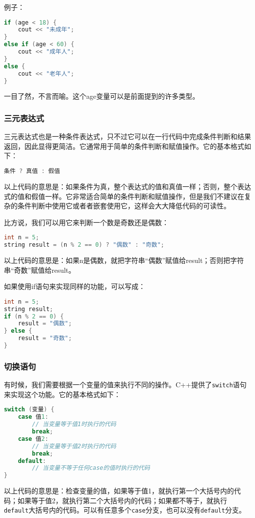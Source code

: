 \documentclass[../main.tex]{subfiles}
\begin{document}
例子：
\begin{lstlisting}[language=C++]
if (age < 18) {
    cout << "未成年";
}
else if (age < 60) {
    cout << "成年人";
}
else {
    cout << "老年人";
}
\end{lstlisting}
一目了然，不言而喻。这个age变量可以是前面提到的许多类型。

\subsubsection{三元表达式}

三元表达式也是一种条件表达式，只不过它可以在一行代码中完成条件判断和结果返回，因此显得更简洁。它通常用于简单的条件判断和赋值操作。它的基本格式如下：
\begin{lstlisting}[language=C++]
条件 ? 真值 : 假值
\end{lstlisting}
以上代码的意思是：如果条件为真，整个表达式的值和真值一样；否则，整个表达式的值和假值一样。它非常适合简单的条件判断和赋值操作，但是我们不建议在复杂的条件判断中使用它或者者嵌套使用它，这样会大大降低代码的可读性。

比方说，我们可以用它来判断一个数是奇数还是偶数：
\begin{lstlisting}[language=C++]
int n = 5;
string result = (n % 2 == 0) ? "偶数" : "奇数";
\end{lstlisting}
以上代码的意思是：如果n是偶数，就把字符串“偶数”赋值给result；否则把字符串“奇数”赋值给result。

如果使用if语句来实现同样的功能，可以写成：
\begin{lstlisting}[language=C++]
int n = 5;
string result;
if (n % 2 == 0) {
    result = "偶数";
} else {
    result = "奇数";
}
\end{lstlisting}

\subsubsection{切换语句}
有时候，我们需要根据一个变量的值来执行不同的操作。C++提供了\texttt{switch}语句来实现这个功能。它的基本格式如下：
\begin{lstlisting}[language=C++]
switch (变量) {
    case 值1:
        // 当变量等于值1时执行的代码
        break;
    case 值2:
        // 当变量等于值2时执行的代码
        break;
    default:
        // 当变量不等于任何case的值时执行的代码
}
\end{lstlisting}
以上代码的意思是：检查变量的值，如果等于值1，就执行第一个大括号内的代码；如果等于值2，就执行第二个大括号内的代码；如果都不等于，就执行\texttt{default}大括号内的代码。可以有任意多个\texttt{case}分支，也可以没有\texttt{default}分支。
\end{document}
